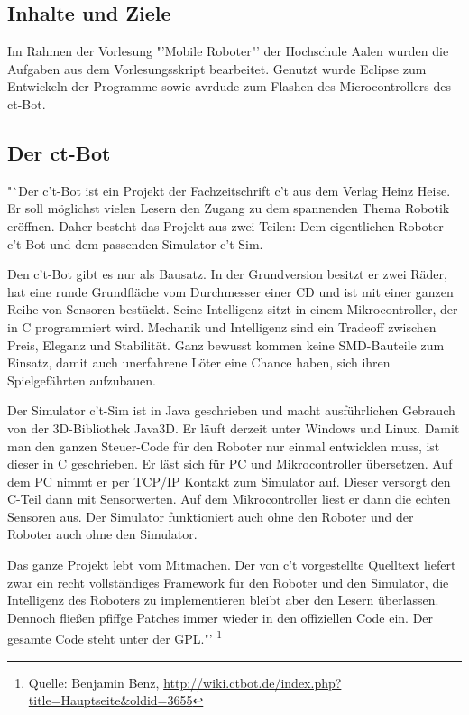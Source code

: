 \subsection{Inhalte und Ziele}
Im Rahmen der Vorlesung "'Mobile Roboter"' der Hochschule Aalen wurden die Aufgaben aus dem Vorlesungsskript bearbeitet.
Genutzt wurde Eclipse zum Entwickeln der Programme sowie avrdude zum Flashen des Microcontrollers des ct-Bot.

\subsection{Der ct-Bot}
"`Der c't-Bot ist ein Projekt der Fachzeitschrift c't aus dem Verlag Heinz Heise.
Er soll möglichst vielen Lesern den Zugang zu dem spannenden Thema Robotik eröffnen.
Daher besteht das Projekt aus zwei Teilen: Dem eigentlichen Roboter c't-Bot und dem passenden Simulator c't-Sim.

Den c't-Bot gibt es nur als Bausatz. In der Grundversion besitzt er zwei Räder,
hat eine runde Grundfläche vom Durchmesser einer CD und ist mit einer ganzen Reihe von Sensoren
bestückt. Seine Intelligenz sitzt in einem Mikrocontroller, der in C programmiert wird. Mechanik
und Intelligenz sind ein Tradeoff zwischen Preis, Eleganz und Stabilität. Ganz bewusst kommen keine
SMD-Bauteile zum Einsatz, damit auch unerfahrene Löter eine Chance haben,
sich ihren Spielgefährten aufzubauen.

Der Simulator c't-Sim ist in Java geschrieben und macht ausführlichen Gebrauch von der
3D-Bibliothek Java3D. Er läuft derzeit unter Windows und Linux. Damit man den ganzen Steuer-Code
für den Roboter nur einmal entwicklen muss, ist dieser in C geschrieben. Er läst sich für PC und Mikrocontroller
übersetzen. Auf dem PC nimmt er per TCP/IP Kontakt zum Simulator auf. Dieser versorgt den C-Teil dann mit Sensorwerten.
Auf dem Mikrocontroller liest er dann die echten Sensoren aus. Der Simulator funktioniert auch
ohne den Roboter und der Roboter auch ohne den Simulator.

Das ganze Projekt lebt vom Mitmachen. Der von c't vorgestellte Quelltext liefert zwar ein recht
vollständiges Framework für den Roboter und den Simulator, die Intelligenz des Roboters zu
implementieren bleibt aber den Lesern überlassen. Dennoch fließen pfiffge Patches immer wieder in
den offiziellen Code ein. Der gesamte Code steht unter der GPL."'
\footnote{Quelle: Benjamin Benz, \url{http://wiki.ctbot.de/index.php?title=Hauptseite&oldid=3655}}



